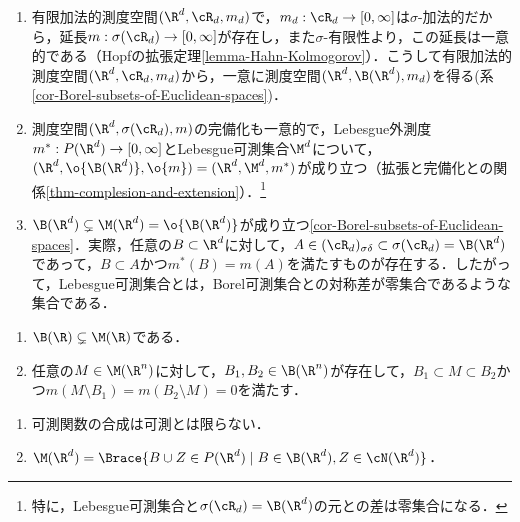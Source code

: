 \documentclass[uplatex, dvipdfmx]{jsreport}
\begin{document}
\begin{definition}\mbox{}
    \begin{enumerate}
        \item 有限加法的測度空間$(\R^d,\cR_d,m_d)$で，$m_d:\cR_d\to[0,\infty]$は$\sigma$-加法的だから，延長$m:\sigma(\cR_d)\to[0,\infty]$が存在し，また$\sigma$-有限性より，この延長は一意的である（Hopfの拡張定理\ref{lemma-Hahn-Kolmogorov}）．こうして有限加法的測度空間$(\R^d,\cR_d,m_d)$から，一意に測度空間$(\R^d,\B(\R^d),m_d)$を得る(系\ref{cor-Borel-subsets-of-Euclidean-spaces})．
        \item 測度空間$(\R^d,\sigma(\cR_d),m)$の完備化も一意的で，Lebesgue外測度$m^*:P(\R^d)\to[0,\infty]$とLebesgue可測集合$\M^d$について，$(\R^d,\o{\B(\R^d)},\o{m})=(\R^d,\M^d,m^*)$が成り立つ（拡張と完備化との関係\ref{thm-complesion-and-extension}）．\footnote{特に，Lebesgue可測集合と$\sigma(\cR_d)=\B(\R^d)$の元との差は零集合になる．}
        \item $\B(\R^d)\subsetneq\M(\R^d)=\o{\B(\R^d)}$が成り立つ\ref{cor-Borel-subsets-of-Euclidean-spaces}．実際，任意の$B\subset\R^d$に対して，$A\in(\cR_d)_{\sigma\delta}\subset\sigma(\cR_d)=\B(\R^d)$であって，$B\subset A$かつ$m^*(B)=m(A)$を満たすものが存在する．したがって，Lebesgue可測集合とは，Borel可測集合との対称差が零集合であるような集合である．
    \end{enumerate}
\end{definition}

\begin{theorem}\mbox{}
    \begin{enumerate}
        \item $\B(\R)\subsetneq\M(\R)$である．
        \item 任意の$M\in\M(\R^n)$に対して，$B_1,B_2\in\B(\R^n)$が存在して，$B_1\subset M\subset B_2$かつ$m(M\setminus B_1)=m(B_2\setminus M)=0$を満たす．
    \end{enumerate}
\end{theorem}

\begin{corollary}\label{cor-composition-of-measurable-function}\mbox{}
    \begin{enumerate}
        \item 可測関数の合成は可測とは限らない．
        \item $\M(\R^d)=\Brace{B\cup Z\in P(\R^d)\mid B\in\B(\R^d),Z\in\cN(\R^d)}$．
    \end{enumerate}
\end{corollary}
\end{document}
